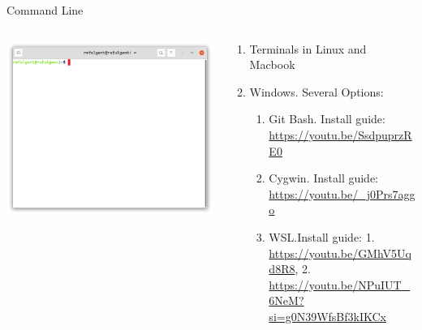 \documentclass[aspectratio=169,xcolor=dvipsnames,svgnames,x11names,fleqn]{beamer}
\begin{document}
\begin{frame}{Command Line}
    \begin{columns}
        \begin{column}{0.5\textwidth}
            \centering
            \includegraphics[width=\textwidth,height=1.0\textheight,keepaspectratio]{figures/terminal.png}
        \end{column}
        \begin{column}{0.5\textwidth}
            \begin{enumerate}
                \item Terminals in Linux and Macbook
                \item Windows. Several Options:
                \begin{enumerate}
                    \item Git Bash. Install guide: \url{https://youtu.be/SsdpuprzRE0}
                    \item Cygwin. Install guide: \url{https://youtu.be/_j0Prs7aggo}
                    \item WSL.Install guide: 1. \url{https://youtu.be/GMhV5Uqd8R8},
                    2. \url{https://youtu.be/NPuIUT_6NeM?si=g0N39WfsBf3kIKCx}
                \end{enumerate}
            \end{enumerate}
        \end{column}
    \end{columns}
\end{frame}
\end{document}

